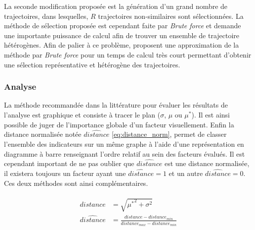 La seconde modification proposée est la génération d’un grand nombre de trajectoires,
dans lesquelles, $R$ trajectoires non-similaires sont sélectionnées. La méthode de sélection
proposée est cependant faite par \emph{Brute force} et demande une importante puissance de
calcul afin de trouver un ensemble de trajectoire hétérogènes.
Afin de palier à ce problème, \cite{Ruano2012103} proposent une approximation de
la méthode par \emph{Brute force} pour un temps de calcul très court permettant d’obtenir
une sélection représentative et hétérogène des trajectoires.


\subsubsection{Analyse} %
\label{ssub:analyse}
La méthode recommandée dans la littérature pour évaluer les résultats de l’analyse
est graphique et consiste à tracer le plan ($\sigma$, $\mu$ ou $\mu^{*}$). Il est
ainsi possible de juger de l’importance globale d’un facteur visuellement.
Enfin la distance normalisée notée $\hat{distance}$ \eqref{eq:distance_norm}, permet
de classer l’ensemble des indicateurs sur un même graphe à l’aide d’une représentation
en diagramme à barre renseignant l’ordre relatif au sein des facteurs évalués.
Il est cependant important de ne pas oublier que $\hat{distance}$ est une distance
normalisée, il existera toujours un facteur ayant une $\hat{distance} = 1$ et un autre
$\hat{distance} = 0$. Ces deux méthodes sont ainsi complémentaires.

\begin{align}\label{eq:distance_norm}
    \begin{split}
        distance        &= \sqrt{{\mu^{*}}^2 + \sigma^{2}} \\
        \hat{distance}  &=  \frac{distance - distance_{min}}{distance_{max} - distance_{min}}
    \end{split}
\end{align}

